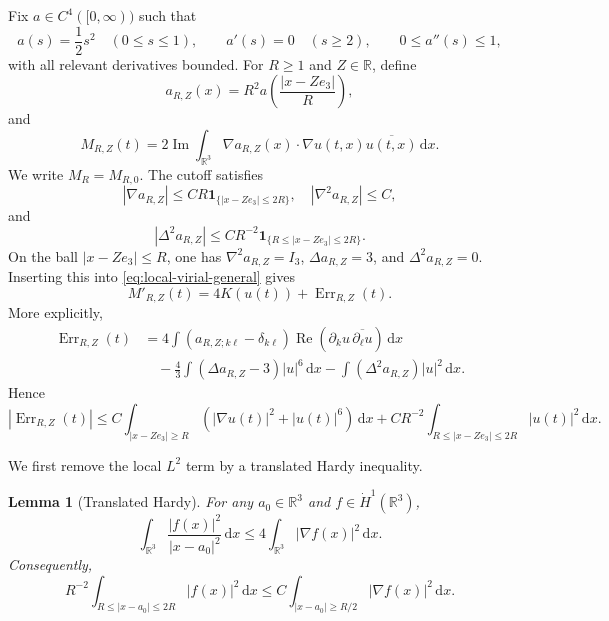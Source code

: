 \documentclass[preprint,12pt]{elsarticle}
\numberwithin{equation}{section}
\newcommand{\R}{\mathbb R}
\newcommand{\dd}{\,\mathrm d}
\newcommand{\na}{\nabla}
\newcommand{\pa}{\partial}
\newcommand{\ez}{e_3}
\newcommand{\Ima}{\operatorname{Im}}
\newcommand{\Rea}{\operatorname{Re}}
\newcommand{\Err}{\operatorname{Err}}
\newcommand{\one}{\mathbf 1}
\newtheorem{lemma}[theorem]{Lemma}
\theoremstyle{remark}
\begin{document}
Fix $a\in C^4([0,\infty))$ such that
\[
  a(s)=\frac12s^2\quad(0\le s\le1),
  \qquad a'(s)=0\quad(s\ge2),
  \qquad 0\le a''(s)\le1,
\]
with all relevant derivatives bounded.  For $R\ge1$ and $Z\in\R$, define
\[
  a_{R,Z}(x)=R^2a\left(\frac{|x-Z\ez|}{R}\right),
\]
and
\[
  M_{R,Z}(t)=2\Ima\int_{\R^3}\na a_{R,Z}(x)\cdot\na u(t,x)\overline{u(t,x)}\dd x.
\]
We write $M_R=M_{R,0}$.  The cutoff satisfies
\begin{equation}\label{eq:cutoff-bounds}
  |\na a_{R,Z}|\le CR\one_{\{|x-Z\ez|\le2R\}},\quad
  |\na^2a_{R,Z}|\le C,
\end{equation}
and
\begin{equation}\label{eq:bi-lap-bound}
  |\Delta^2a_{R,Z}|\le CR^{-2}\one_{\{R\le |x-Z\ez|\le2R\}}.
\end{equation}
On the ball $|x-Z\ez|\le R$, one has $\na^2a_{R,Z}=I_3$, $\Delta a_{R,Z}=3$, and $\Delta^2a_{R,Z}=0$.  Inserting this into \eqref{eq:local-virial-general} gives
\begin{equation}\label{eq:MRZ-derivative}
  M'_{R,Z}(t)=4K(u(t))+\Err_{R,Z}(t).
\end{equation}
More explicitly,
\begin{align*}
  \Err_{R,Z}(t)
  &=4\int (a_{R,Z;k\ell}-\delta_{k\ell})
        \Rea(\pa_k u\,\overline{\pa_\ell u})\dd x \\
  &\quad -\frac43\int(\Delta a_{R,Z}-3)|u|^6\dd x
        -\int(\Delta^2a_{R,Z})|u|^2\dd x.
\end{align*}
Hence
\begin{equation}\label{eq:error-prehardy}
  |\Err_{R,Z}(t)|\le C\int_{|x-Z\ez|\ge R}
  (|\na u(t)|^2+|u(t)|^6)\dd x
  +CR^{-2}\int_{R\le |x-Z\ez|\le2R}|u(t)|^2\dd x.
\end{equation}

We first remove the local $L^2$ term by a translated Hardy inequality.

\begin{lemma}[Translated Hardy]\label{lem:shifted-hardy}
For any $a_0\in\R^3$ and $f\in\dot H^1(\R^3)$,
\begin{equation}\label{eq:shifted-hardy}
  \int_{\R^3}\frac{|f(x)|^2}{|x-a_0|^2}\dd x
  \le4\int_{\R^3}|\na f(x)|^2\dd x.
\end{equation}
Consequently,
\begin{equation}\label{eq:annulus-hardy}
  R^{-2}\int_{R\le |x-a_0|\le2R}|f(x)|^2\dd x
  \le C\int_{|x-a_0|\ge R/2}|\na f(x)|^2\dd x.
\end{equation}
\end{lemma}
\end{document}

